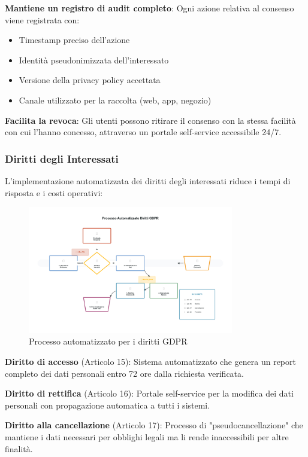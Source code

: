\textbf{Mantiene un registro di audit completo}: Ogni azione relativa al consenso viene registrata con:
\begin{itemize}
    \item Timestamp preciso dell'azione
    \item Identità pseudonimizzata dell'interessato
    \item Versione della privacy policy accettata
    \item Canale utilizzato per la raccolta (web, app, negozio)
\end{itemize}

\textbf{Facilita la revoca}: Gli utenti possono ritirare il consenso con la stessa facilità con cui l'hanno concesso, attraverso un portale self-service accessibile 24/7.

\subsubsection{Diritti degli Interessati}

L'implementazione automatizzata dei diritti degli interessati riduce i tempi di risposta e i costi operativi:

\begin{figure}[h]
\centering
\includegraphics[width=0.8\textwidth]{thesis_figures/cap4/figura_4_3_processo_premium.pdf}
\caption{Processo automatizzato per i diritti GDPR}
\label{fig:processo_diritti}
\end{figure}

\textbf{Diritto di accesso} (Articolo 15): Sistema automatizzato che genera un report completo dei dati personali entro 72 ore dalla richiesta verificata.

\textbf{Diritto di rettifica} (Articolo 16): Portale self-service per la modifica dei dati personali con propagazione automatica a tutti i sistemi.

\textbf{Diritto alla cancellazione} (Articolo 17): Processo di "pseudocancellazione" che mantiene i dati necessari per obblighi legali ma li rende inaccessibili per altre finalità.

